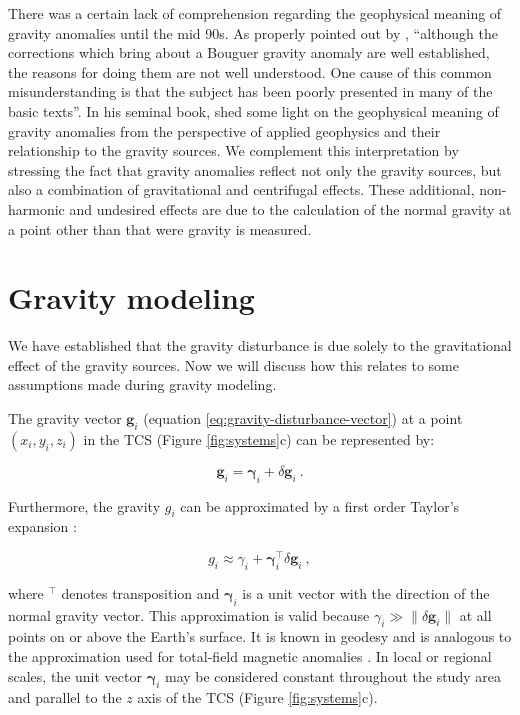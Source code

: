 \documentclass[manuscript]{geophysics}
\begin{document}
There was a certain lack of comprehension regarding the geophysical meaning of
gravity anomalies until the mid 90s.
As properly pointed out by \citet{chapin1996},
``although the corrections which bring about a Bouguer gravity anomaly are well
established, the reasons for doing them are not well understood. One cause of
this common misunderstanding is that the subject has been poorly presented in
many of the basic texts''.
In his seminal book, \citet{blakely1996} shed some light on the geophysical
meaning of gravity anomalies from the perspective of applied geophysics and
their relationship to the gravity sources.
We complement this interpretation by stressing the fact that
gravity anomalies reflect not only the gravity sources,
but also a combination of gravitational and centrifugal effects.
These additional, non-harmonic and undesired effects are due to the calculation
of the normal gravity at a point other than that were gravity is measured.


\section{Gravity modeling}

We have established that the gravity disturbance is due solely to the
gravitational effect of the gravity sources.
Now we will discuss how this relates to some assumptions made during gravity
modeling.

The gravity vector $\mathbf{g}_i$ (equation \ref{eq:gravity-disturbance-vector})
at a point $(x_i, y_i, z_i)$ in the TCS (Figure \ref{fig:systems}c) can be
represented by:

\begin{equation}
\mathbf{g}_i = \mathbf{\gamma}_i + \delta \mathbf{g}_i \: .
\label{eq:gravity-vector-TCS}
\end{equation}

\noindent
Furthermore, the gravity $g_i$ can be approximated by a first order Taylor's
expansion \citep{sanso_sideris2013}:

\begin{equation}
g_i \approx \gamma_i +
\mathbf{\gamma}_i^{\top} \delta \mathbf{g}_i \: ,
\label{eq:gobs-approx}
\end{equation}

\noindent
where $^{\top}$ denotes transposition and $\mathbf{\gamma}_{i}$ is a unit
vector with the direction of the normal gravity vector.
This approximation is valid because
$\gamma_{i} \gg \| \delta \mathbf{g}_{i} \|$ at all points on or above the
Earth's surface.
It is known in geodesy \citep[e.g.,][]{sanso_sideris2013}
and is analogous to the approximation used for
total-field magnetic anomalies \citep[e.g.,][]{blakely1996}.
In local or regional scales, the unit
vector $\mathbf{\gamma}_{i}$
may be considered constant throughout the study area and
parallel to the $z$ axis of the TCS (Figure \ref{fig:systems}c).
\end{document}
